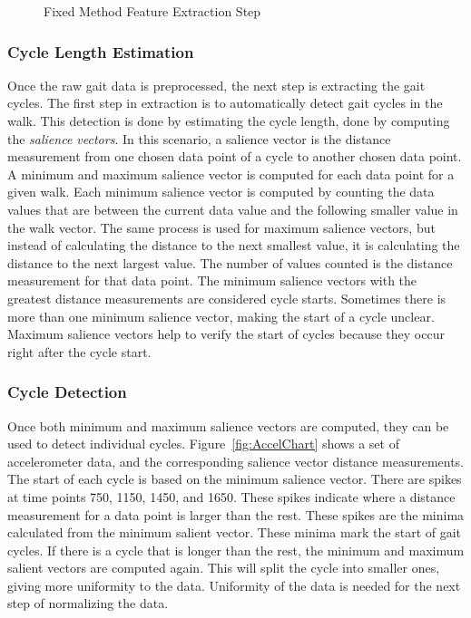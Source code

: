 \documentclass{sig-alternate}
\begin{document}
\begin{figure}
\centering
{}
\caption{Fixed Method Feature Extraction Step}
\label{fig:SecondStep}
\end{figure}

			
\subsubsection{Cycle Length Estimation}
	Once the raw gait data is preprocessed, the next step is extracting the gait cycles. The first step in extraction is to automatically detect gait cycles in the walk. This detection is done by estimating the cycle length, done by computing the \textit{salience vectors}. In this scenario, a salience vector is the distance measurement from one chosen data point of a cycle to another chosen data point. A minimum and maximum salience vector is computed for each data point for a given walk. Each minimum salience vector is computed by counting the data values that are between the current data value and the following smaller value in the walk vector. The same process is used for maximum salience vectors, but instead of calculating the distance to the next smallest value, it is calculating the distance to the next largest value. The number of values counted is the distance measurement for that data point. The minimum salience vectors with the greatest distance measurements are considered cycle starts. Sometimes there is more than one minimum salience vector, making the start of a cycle unclear. Maximum salience vectors help to verify the start of cycles because they occur right after the cycle start.
			
\subsubsection{Cycle Detection}
	Once both minimum and maximum salience vectors are computed, they can be used to detect individual cycles. Figure~\ref{fig:AccelChart} shows a set of accelerometer data, and the corresponding salience vector distance measurements. The start of each cycle is based on the minimum salience vector. There are spikes at time points 750, 1150, 1450, and 1650. These spikes indicate where a distance measurement for a data point is larger than the rest. These spikes are the minima calculated from the minimum salient vector. These minima mark the start of gait cycles. If there is a cycle that is longer than the rest, the minimum and maximum salient vectors are computed again. This will split the cycle into smaller ones, giving more uniformity to the data. Uniformity of the data is needed for the next step of normalizing the data.
\end{document}
